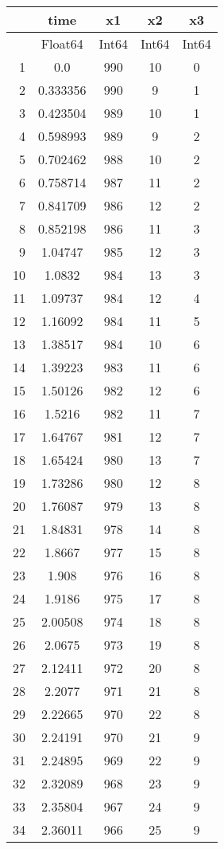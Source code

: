 \documentclass[12pt,a4paper]{article}
\begin{document}
\begin{tabular}{r|cccc}
	& time & x1 & x2 & x3\\
	\hline
	& Float64 & Int64 & Int64 & Int64\\
	\hline
	1 & 0.0 & 990 & 10 & 0 \\
	2 & 0.333356 & 990 & 9 & 1 \\
	3 & 0.423504 & 989 & 10 & 1 \\
	4 & 0.598993 & 989 & 9 & 2 \\
	5 & 0.702462 & 988 & 10 & 2 \\
	6 & 0.758714 & 987 & 11 & 2 \\
	7 & 0.841709 & 986 & 12 & 2 \\
	8 & 0.852198 & 986 & 11 & 3 \\
	9 & 1.04747 & 985 & 12 & 3 \\
	10 & 1.0832 & 984 & 13 & 3 \\
	11 & 1.09737 & 984 & 12 & 4 \\
	12 & 1.16092 & 984 & 11 & 5 \\
	13 & 1.38517 & 984 & 10 & 6 \\
	14 & 1.39223 & 983 & 11 & 6 \\
	15 & 1.50126 & 982 & 12 & 6 \\
	16 & 1.5216 & 982 & 11 & 7 \\
	17 & 1.64767 & 981 & 12 & 7 \\
	18 & 1.65424 & 980 & 13 & 7 \\
	19 & 1.73286 & 980 & 12 & 8 \\
	20 & 1.76087 & 979 & 13 & 8 \\
	21 & 1.84831 & 978 & 14 & 8 \\
	22 & 1.8667 & 977 & 15 & 8 \\
	23 & 1.908 & 976 & 16 & 8 \\
	24 & 1.9186 & 975 & 17 & 8 \\
	25 & 2.00508 & 974 & 18 & 8 \\
	26 & 2.0675 & 973 & 19 & 8 \\
	27 & 2.12411 & 972 & 20 & 8 \\
	28 & 2.2077 & 971 & 21 & 8 \\
	29 & 2.22665 & 970 & 22 & 8 \\
	30 & 2.24191 & 970 & 21 & 9 \\
	31 & 2.24895 & 969 & 22 & 9 \\
	32 & 2.32089 & 968 & 23 & 9 \\
	33 & 2.35804 & 967 & 24 & 9 \\
	34 & 2.36011 & 966 & 25 & 9 \\

\end{tabular}
\end{document}

